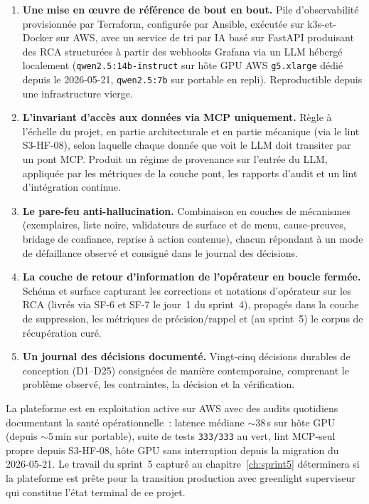 \documentclass[11pt,a4paper,oneside]{report}
\begin{document}
\begin{enumerate}
  \item \textbf{Une mise en \oe{}uvre de référence de bout en bout.}
        Pile d'observabilité provisionnée par Terraform, configurée
        par Ansible, exécutée sur k3s-et-Docker sur AWS, avec un
        service de tri par IA basé sur FastAPI produisant des RCA
        structurées à partir des webhooks Grafana via un LLM
        hébergé localement (\texttt{qwen2.5:14b-instruct} sur hôte
        GPU AWS \texttt{g5.xlarge} dédié depuis le 2026-05-21,
        \texttt{qwen2.5:7b} sur portable en repli). Reproductible
        depuis une infrastructure vierge.
  \item \textbf{L'invariant d'accès aux données via MCP uniquement.}
        Règle à l'échelle du projet, en partie architecturale et
        en partie mécanique (via le lint S3-HF-08), selon laquelle
        chaque donnée que voit le LLM doit transiter par un pont
        MCP. Produit un régime de provenance sur l'entrée du LLM,
        appliquée par les métriques de la couche pont, les
        rapports d'audit et un lint d'intégration continue.
  \item \textbf{Le pare-feu anti-hallucination.} Combinaison en
        couches de mécanismes (exemplaires, liste noire, validateurs
        de surface et de menu, cause-preuves, bridage de confiance,
        reprise à action contenue), chacun répondant à un mode de
        défaillance observé et consigné dans le journal des
        décisions.
  \item \textbf{La couche de retour d'information de l'opérateur
        en boucle fermée.} Schéma et surface capturant les
        corrections et notations d'opérateur sur les RCA (livrés
        via SF-6 et SF-7 le jour~1 du sprint~4), propagés dans la
        couche de suppression, les métriques de précision/rappel
        et (au sprint~5) le corpus de récupération curé.
  \item \textbf{Un journal des décisions documenté.} Vingt-cinq
        décisions durables de conception (D1--D25) consignées de
        manière contemporaine, comprenant le problème observé, les
        contraintes, la décision et la vérification.
\end{enumerate}

La plateforme est en exploitation active sur AWS avec des audits
quotidiens documentant la santé opérationnelle~: latence médiane
$\sim$38\,s sur hôte GPU (depuis $\sim$5\,min sur portable),
suite de tests \texttt{333/333} au vert, lint MCP-seul propre
depuis S3-HF-08, hôte GPU sans interruption depuis la migration
du 2026-05-21. Le travail du sprint~5 capturé au
chapitre~\ref{ch:sprint5} déterminera si la plateforme est prête
pour la transition production avec greenlight superviseur qui
constitue l'état terminal de ce projet.
\end{document}
